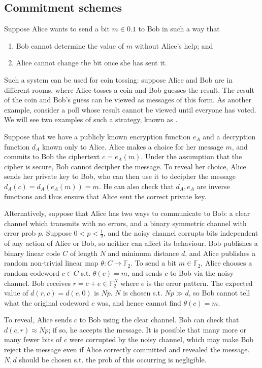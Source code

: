 \subsection{Commitment schemes}
Suppose Alice wants to send a bit $m \in \qty{0,1}$ to Bob in such a way that
\begin{enumerate}
    \item Bob cannot determine the value of $m$ without Alice's help; and
    \item Alice cannot change the bit once she has sent it.
\end{enumerate}
Such a system can be used for coin tossing: suppose Alice and Bob are in different rooms, where Alice tosses a coin and Bob guesses the result.
The result of the coin and Bob's guess can be viewed as messages of this form.
As another example, consider a poll whose result cannot be viewed until everyone has voted.
We will see two examples of such a  strategy, known as .

Suppose that we have a publicly known encryption function $e_A$ and a decryption function $d_A$ known only to Alice.
Alice makes a choice for her message $m$, and commits to Bob the ciphertext $c = e_A(m)$.
Under the assumption that the cipher is secure, Bob cannot decipher the message.
To reveal her choice, Alice sends her private key to Bob, who can then use it to decipher the message $d_A(c) = d_A(e_A(m)) = m$.
He can also check that $d_A, e_A$ are inverse functions and thus ensure that Alice sent the correct private key.

Alternatively, suppose that Alice has two ways to communicate to Bob: a clear channel which transmits with no errors, and a binary symmetric channel with error prob $p$.
Suppose $0 < p < \frac{1}{2}$, and the noisy channel corrupts bits independent of any action of Alice or Bob, so neither can affect its behaviour.
Bob publishes a binary linear code $C$ of length $N$ and minimum distance $d$, and Alice publishes a random non-trivial linear map $\theta \colon C \to \mathbb F_2$.
To send a bit $m \in \mathbb F_2$, Alice chooses a random codeword $c \in C$ s.t. $\theta(c) = m$, and sends $c$ to Bob via the noisy channel.
Bob receives $r = c + e \in \mathbb F_2^N$ where $e$ is the error pattern.
The expected value of $d(r,c) = d(e,0)$ is $Np$.
$N$ is chosen s.t. $Np \gg d$, so Bob cannot tell what the original codeword $c$ was, and hence cannot find $\theta(c) = m$.

To reveal, Alice sends $c$ to Bob using the clear channel.
Bob can check that $d(c,r) \approx Np$; if so, he accepts the message.
It is possible that many more or many fewer bits of $c$ were corrupted by the noisy channel, which may make Bob reject the message even if Alice correctly committed and revealed the message.
$N, d$ should be chosen s.t. the prob of this occurring is negligible.

